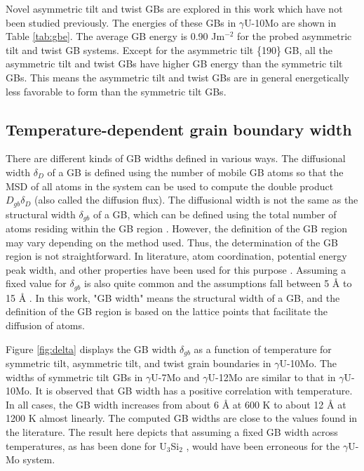 \documentclass{elsarticle}
\begin{document}
Novel asymmetric tilt and twist GBs are explored in this work which have not been studied previously. The energies of these GBs in $\gamma$U-10Mo are shown in Table \ref{tab:gbe}. The average GB energy is 0.90 Jm$^{-2}$ for the probed asymmetric tilt and twist GB systems. Except for the asymmetric tilt \{190\} GB, all the asymmetric tilt and twist GBs have higher GB energy than the symmetric tilt GBs. This means the asymmetric tilt and twist GBs are in general energetically less favorable to form than the symmetric tilt GBs.


\FloatBarrier
\subsection{Temperature-dependent grain boundary width}\label{sec:res1}

There are different kinds of GB widths defined in various ways. The diffusional width $\delta_D$ of a GB is defined using the number of mobile GB atoms so that the MSD of all atoms in the system can be used to compute the double product $D_{gb} \delta_D$ (also called the diffusion flux). The diffusional width is not the same as the structural width $\delta_{gb}$ of a GB, which can be defined using the total number of atoms residing within the GB region \cite{peterson1986, keblinski1999}. However, the definition of the GB region may vary depending on the method used. Thus, the determination of the GB region is not straightforward. In literature, atom coordination, potential energy peak width, and other properties have been used for this purpose \cite{riet2021, koju2020}. Assuming a fixed value for $\delta_{gb}$ is also quite common and the assumptions fall between 5 \r{A} to 15 \r{A} \cite{suzuki2005, cooper2021, popov2022}. In this work, "GB width" means the structural width of a GB, and the definition of the GB region is based on the lattice points that facilitate the diffusion of atoms.

Figure \ref{fig:delta} displays the GB width $\delta_{gb}$ as a function of temperature for symmetric tilt, asymmetric tilt, and twist grain boundaries in $\gamma$U-10Mo. The widths of symmetric tilt GBs in $\gamma$U-7Mo and $\gamma$U-12Mo are similar to that in $\gamma$U-10Mo. It is observed that GB width has a positive correlation with temperature. In all cases, the GB width increases from about 6 \r{A} at 600 K to about 12 \r{A} at 1200 K almost linearly. The computed GB widths are close to the values found in the literature. The result here depicts that assuming a fixed GB width across temperatures, as has been done for U$_3$Si$_2$ \cite{cooper2021}, would have been erroneous for the $\gamma$U-Mo system.
\end{document}
